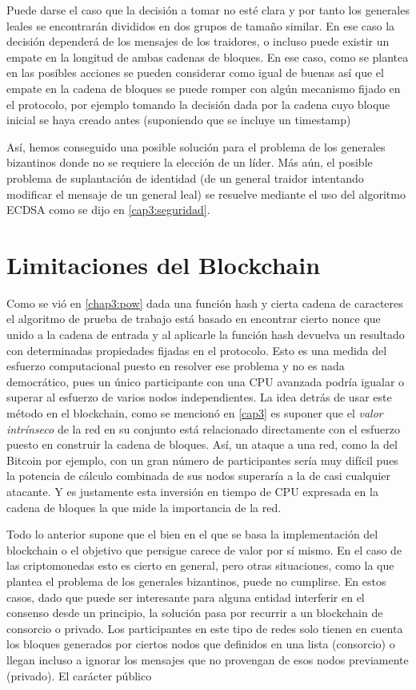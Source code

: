 Puede darse el caso que la decisión a tomar no esté clara y por tanto los generales leales se encontrarán divididos en dos grupos de tamaño similar. En ese caso la decisión dependerá de los mensajes de los traidores, o incluso puede existir un empate en la longitud de ambas cadenas de bloques. En ese caso, como se plantea en \citep{byzantine generals} las posibles acciones se pueden considerar como igual de buenas así que el empate en la cadena de bloques se puede romper con algún mecanismo fijado en el protocolo, por ejemplo tomando la decisión dada por la cadena cuyo bloque inicial se haya creado antes (suponiendo que se incluye un timestamp)

Así, hemos conseguido una posible solución para el problema de los generales bizantinos donde no se requiere la elección de un líder. Más aún, el posible problema de suplantación de identidad (de un general traidor intentando modificar el mensaje de un general leal) se resuelve mediante el uso del algoritmo ECDSA como se dijo en \ref{cap3:seguridad}.
\section{Limitaciones del Blockchain}
Como se vió en \ref{chap3:pow} dada una función hash y cierta cadena de caracteres el algoritmo de prueba de trabajo está basado en encontrar cierto nonce que unido a la cadena de entrada y al aplicarle la función hash devuelva un resultado con determinadas propiedades fijadas en el protocolo. Esto es una medida del esfuerzo computacional puesto en resolver ese problema y no es nada democrático, pues un único participante con una CPU avanzada podría igualar o superar al esfuerzo de varios nodos independientes. La idea detrás de usar este método en el blockchain, como se mencionó en \ref{cap3} es suponer que el \textit{valor intrínseco} de la red en su conjunto está relacionado directamente con el esfuerzo puesto en construir la cadena de bloques. Así, un ataque a una red, como la del Bitcoin por ejemplo, con un gran número de participantes sería muy difícil pues la potencia de cálculo combinada de sus nodos superaría a la de casi cualquier atacante. Y es justamente esta inversión en tiempo de CPU expresada en la cadena de bloques la que mide la importancia de la red.

Todo lo anterior supone que el bien en el que se basa la implementación del blockchain o el objetivo que persigue carece de valor por sí mismo. En el caso de las criptomonedas esto es cierto en general, pero otras situaciones, como la que plantea el problema de los generales bizantinos, puede no cumplirse.
En estos casos, dado que puede ser interesante para alguna entidad interferir en el consenso desde un principio, la solución pasa por recurrir a un blockchain de consorcio o privado. Los participantes en este tipo de redes solo tienen en cuenta los bloques generados por ciertos nodos que definidos en una lista (consorcio) o llegan incluso a ignorar los mensajes que no provengan de esos nodos previamente (privado). El carácter público

